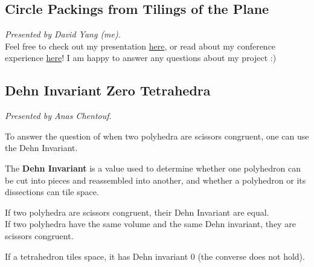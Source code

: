 \documentclass[12pt]{amsart}
\begin{document}
\newpage

\subsection{Circle Packings from Tilings of the Plane}

\textit{}

\vspace{0.25cm}

\textit{Presented by David Yang (me).} \\

Feel free to check out my presentation \href{https://github.com/dyang5/CirclePackingsResearch/blob/main/presentations/YMC_Presentation.pdf}{here}, or read about my conference experience \href{https://github.com/dyang5/CirclePackingsResearch/blob/main/Conferences/writeups/YMC_Writeup.md}{here}! I am happy to answer any questions about my project :)

\vspace{2cm}

\subsection{Dehn Invariant Zero Tetrahedra} 

\textit{}

\vspace{0.25cm}

\textit{Presented by Anas Chentouf.}

To answer the question of when two polyhedra are scissors congruent, one can use the Dehn Invariant.
\begin{definition}
The \textbf{Dehn Invariant} is a value used to determine whether one polyhedron can be cut into pieces and reassembled into another, and whether a polyhedron or its dissections can tile space.
\end{definition}

\begin{theorem*}
If two polyhedra are scissors congruent, their Dehn Invariant are equal. \\

If two polyhedra have the same volume and the same Dehn invariant, they are scissors congruent.
\end{theorem*}

\begin{theorem*}[Debrunner, 1980]
If a tetrahedron tiles space, it has Dehn invariant $0$ (the converse does not hold).
\end{theorem*}
\end{document}
